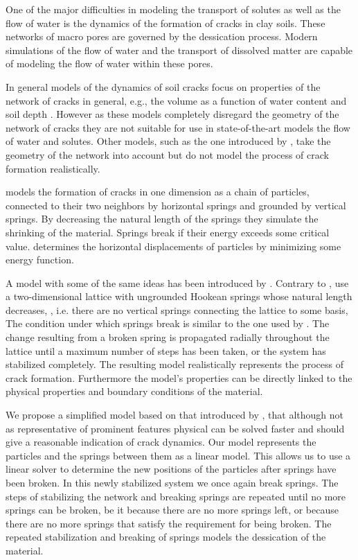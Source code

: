 One of the major difficulties in modeling the transport of solutes as well as the flow of water is the dynamics of the formation of cracks in clay soils. These networks of macro pores are governed by the dessication process. Modern simulations of the flow of water and the transport of dissolved matter are capable of modeling the flow of water within these pores\cite{vogel2005studies2}.

In general models of the dynamics of soil cracks focus on properties of the network of cracks in general, e.g., the volume as a function of water content and soil depth \cite{chertkov2000using}. However as these models completely disregard the geometry of the network of cracks they are not suitable for use in state-of-the-art models the flow of water and solutes. Other models, such as the one introduced by \textcite{horgan2000empirical}, take the geometry of the network into account but do not model the process of crack formation realistically. 

\textcite{kitsunezaki1999fracture} models the formation of cracks in one dimension as a chain of particles, connected to their two neighbors by horizontal springs and grounded by vertical springs. By decreasing the natural length of the springs they simulate the shrinking of the material. Springs break if their energy exceeds some critical value. \citeauthor{kitsunezaki1999fracture} determines the horizontal displacements of particles by minimizing some energy function. 

A model with some of the same ideas has been introduced by \textcite{vogel2005studies2}. Contrary to \citeauthor{kitsunezaki1999fracture}, \citeauthor{vogel2005studies2} use a two-dimensional lattice with ungrounded Hookean springs whose natural length decreases, , i.e. there are no vertical springs connecting the lattice to some basis,  The condition under which springs break is similar to the one used by \citeauthor{kitsunezaki1999fracture}. The change resulting from a broken spring is propagated radially throughout the lattice until a maximum number of steps has been taken, or the system has stabilized completely. The resulting model realistically represents the process of crack formation. Furthermore the model's properties can be directly linked to the physical properties and boundary conditions of the material.

We propose a simplified model based on that introduced by \citeauthor{vogel2005studies2}, that although not as representative of prominent features physical can be solved faster and should give a reasonable indication of crack dynamics. Our model represents the particles and the springs between them as a linear model. This allows us to use a linear solver to determine the new positions of the particles after springs have been broken. In this newly stabilized system we once again break springs. The steps of stabilizing the network and breaking springs are repeated until no more springs can be broken, be it because there are no more springs left, or because there are no more springs that satisfy the requirement for being broken. The repeated stabilization and breaking of springs models the dessication of the material.

